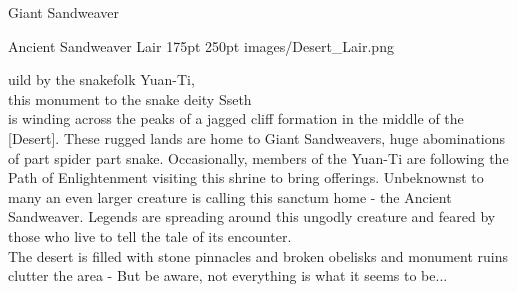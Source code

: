 \documentclass[10pt,openany,twoside,twocolumn]{book}
\begin{document}
\begin{DndMonster}[width=0.5\textwidth]{Giant Sandweaver}
    \DndMonsterAttack[
      name=Scythe Slashing,
      distance=melee, %
      mod=+6,
      reach=5,
      targets=one target,
      dmg={\DndDice{3d8 + 8}},
      dmg-type=piercing,
    ]
      
    \DndMonsterAttack[
      name=Web Shooter (Recharge 5-6),
      distance=ranged, %
      mod=+3,
      reach=20/60,
      targets=5 ft. radius,
      extra={Any target within the radius is restrained by webbing. As an action, the restrained target can make a DC 16 Strength check, bursting the web on a success. The webbing can also be attacked and destroyed (AC 10; HP 7; vulnerability to fire damage; immunity to bludgeoning, poison, and psychic damage)},
    ]
      
\end{DndMonster}


\MonsterBannerGraphic%
	{Ancient Sandweaver Lair}%
	{175pt}%
	{250pt}%
	{images/Desert_Lair.png}%
	{}%
	
\entryfont \noindent {}uild by the snakefolk Yuan-Ti,\\ this monument to the snake deity Sseth\\ is winding across the peaks of a jagged cliff formation in the middle of the [Desert]. These rugged lands are home to Giant Sandweavers, huge abominations of part spider part snake. Occasionally, members of the Yuan-Ti are following the Path of Enlightenment visiting this shrine to bring offerings. Unbeknownst to many an even larger creature is calling this sanctum home - the Ancient Sandweaver. Legends are spreading around this ungodly creature and feared by those who live to tell the tale of its encounter.\\
The desert is filled with stone pinnacles and broken obelisks and monument ruins clutter the area - But be aware, not everything is what it seems to be...
	
\end{document}
